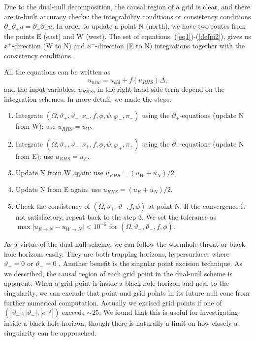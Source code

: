 \documentclass[aps,showpacs,twocolumn,draft,eqsecnum]{revtex4}
\begin{document}
Due to the dual-null decomposition, the causal region of a grid is clear, and
there are in-built accuracy checks: the integrability conditions or consistency
conditions $\partial_-\partial_+u=\partial_+\partial_-u$. In order to update a
point N (north), we have two routes from the points E (east) and W (west). The
set of equations, (\ref{eq1})-(\ref{defpi2}), gives us $x^+$-direction (W to N)
and $x^-$-direction (E to N) integrations together with the consistency
conditions.

All the equations can be written as
\begin{equation} u_{new}=u_{old}+ f(u_{RHS})\Delta,
\end{equation}
and the input variables, $u_{RHS}$, in the right-hand-side term depend on the
integration schemes. In more detail, we made the steps:
\begin{enumerate}
\item Integrate
$(\Omega, \vartheta_+, \vartheta_-, \nu_-, f, \phi, \psi, \wp_-, \pi_-)$ using
the $\partial_+$-equations (update N from W): use $u_{RHS}=u_{W}$.
\item Integrate
$(\Omega, \vartheta_+, \vartheta_-, \nu_+, f, \phi, \psi, \wp_+, \pi_+)$ using
the $\partial_-$-equations (update N from E): use $u_{RHS}=u_{E}$.
\item Update N from W again: use $u_{RHS}=(u_{W}+u_{N})/2$.
\item Update N from E again: use $u_{RHS}=(u_{E}+u_{N})/2$.
\item Check the consistency of
$(\Omega, \vartheta_+, \vartheta_-, f, \phi)$ at point N.  If the convergence
is not satisfactory, repeat back to the step 3. We set the tolerance as
$\max|u_{E \rightarrow N}-u_{W \rightarrow N}| < 10^{-5}$ for $(\Omega,
\vartheta_+, \vartheta_-, f, \phi)$.
\end{enumerate}
As a virtue of the dual-null scheme, we can follow the wormhole throat or
black-hole horizons easily. They are both trapping horizons, hypersurfaces
where $\vartheta_+=0$ or $\vartheta_-=0$ \cite{1st,bhd}. Another benefit is the
singular point excision technique. As we described, the causal region of each
grid point in the dual-null scheme is apparent.  When a grid point is inside a
black-hole horizon and near to the singularity, we can exclude that point and
grid points in its future null cone from further numerical computation.
Actually we excised grid points if one of
$(|\vartheta_+|,|\vartheta_-|,|e^{-f}|)$ exceeds $\sim 25$. We found that this
is useful for investigating inside a black-hole horizon, though there is
naturally a limit on how closely a singularity can be approached.
\end{document}
